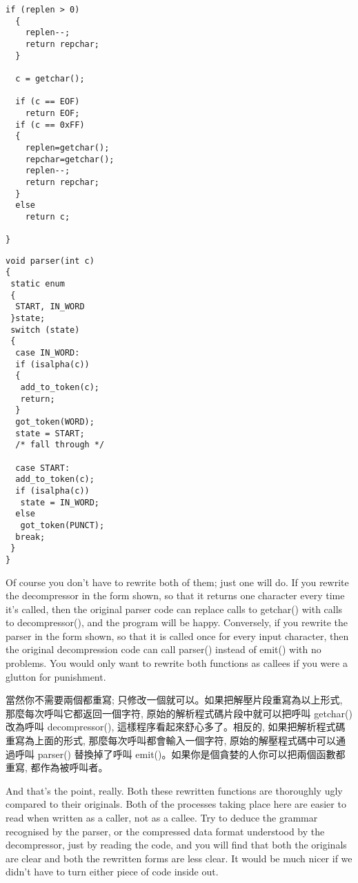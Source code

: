 \documentclass[12pt]{article}
\begin{document}
\begin{CJK}{UTF8}{bsmi}
\begin{multicols}{2}
\begin{lstlisting}[caption=decompression, basicstyle=\footnotesize]
  if (replen > 0) 
  {
    replen--;
    return repchar;
  }

  c = getchar();

  if (c == EOF)
    return EOF;
  if (c == 0xFF) 
  {
    replen=getchar();
    repchar=getchar();
    replen--;
    return repchar;
  }
  else
    return c;

}
\end{lstlisting}

\begin{lstlisting}[caption=parsesr, basicstyle=\footnotesize, breaklines=true]
void parser(int c) 
{
 static enum 
 {
  START, IN_WORD
 }state;
 switch (state) 
 {
  case IN_WORD:
  if (isalpha(c)) 
  {
   add_to_token(c);
   return;
  }
  got_token(WORD);
  state = START;
  /* fall through */

  case START:
  add_to_token(c);
  if (isalpha(c))
   state = IN_WORD;
  else
   got_token(PUNCT);
  break;
 }
}
\end{lstlisting}
\end{multicols}

 Of course you don't have to rewrite both of them; just one will do. If you rewrite the decompressor in the form shown, so that it returns one character every time it's called, then the original parser code can replace calls to getchar() with calls to decompressor(), and the program will be happy. Conversely, if you rewrite the parser in the form shown, so that it is called once for every input character, then the original decompression code can call parser() instead of emit() with no problems. You would only want to rewrite both functions as callees if you were a glutton for punishment.

當然你不需要兩個都重寫; 只修改一個就可以。如果把解壓片段重寫為以上形式, 那麼每次呼叫它都返回一個字符, 原始的解析程式碼片段中就可以把呼叫 getchar() 改為呼叫 decompressor(), 這樣程序看起來舒心多了。相反的, 如果把解析程式碼重寫為上面的形式, 那麼每次呼叫都會輸入一個字符, 原始的解壓程式碼中可以通過呼叫 parser() 替換掉了呼叫 emit()。如果你是個貪婪的人你可以把兩個函數都重寫, 都作為被呼叫者。

 And that's the point, really. Both these rewritten functions are thoroughly ugly compared to their originals. Both of the processes taking place here are easier to read when written as a caller, not as a callee. Try to deduce the grammar recognised by the parser, or the compressed data format understood by the decompressor, just by reading the code, and you will find that both the originals are clear and both the rewritten forms are less clear. It would be much nicer if we didn't have to turn either piece of code inside out.



\end{CJK}
\end{document}
